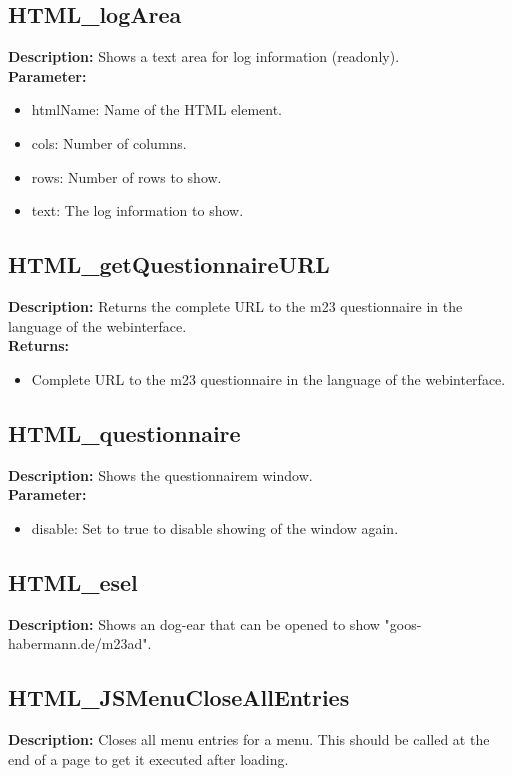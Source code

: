 \subsection{HTML\_logArea}
\textbf{Description:} Shows a text area for log information (readonly).\\
\textbf{Parameter:}
\begin{itemize}
\item htmlName: Name of the HTML element.
\item cols: Number of columns.
\item rows: Number of rows to show.
\item text: The log information to show.
\end{itemize}

\subsection{HTML\_getQuestionnaireURL}
\textbf{Description:} Returns the complete URL to the m23 questionnaire in the language of the webinterface.\\
\textbf{Returns:}
\begin{itemize}
\item Complete URL to the m23 questionnaire in the language of the webinterface.
\end{itemize}

\subsection{HTML\_questionnaire}
\textbf{Description:} Shows the questionnairem window.\\
\textbf{Parameter:}
\begin{itemize}
\item disable: Set to true to disable showing of the window again.
\end{itemize}

\subsection{HTML\_esel}
\textbf{Description:} Shows an dog-ear that can be opened to show "goos-habermann.de/m23ad".\\

\subsection{HTML\_JSMenuCloseAllEntries}
\textbf{Description:} Closes all menu entries for a menu. This should be called at the end of a page to get it executed after loading.\\


